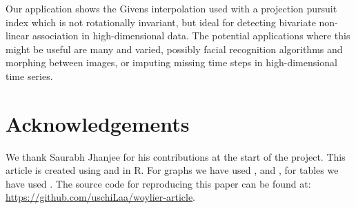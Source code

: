 Our application shows the Givens interpolation used with a projection pursuit index which is not rotationally invariant, but ideal for detecting bivariate non-linear association in high-dimensional data. The potential applications where this might be useful are many and varied, possibly facial recognition algorithms and morphing between images, or imputing missing time steps in high-dimensional time series.

\section*{Acknowledgements}\label{acknowledgements}

We thank Saurabh Jhanjee for his contributions at the start of the project. This article is created using  \citep{knitr} and  \citep{rmarkdown} in R. For graphs we have used  \citep{ggplot2},  \citep{cowplot} and  \citep{ggally}, for tables we have used  \citep{kableextra}. The source code for reproducing this paper can be found at: \url{https://github.com/uschiLaa/woylier-article}.



\address{%
Zoljargal Batsaikhan\\
Monash University\\%
Department of Econometrics and Business Statistics\\ Clayton, VIC, Australia\\
%
\url{https://github.com/zolabat}\\%
\textit{ORCiD: \href{https://orcid.org/0009-0005-0055-1448}{0009-0005-0055-1448}}\\%
\href{mailto:zoljargal11@gmail.com}{\nolinkurl{zoljargal11@gmail.com}}%
}

\address{%
Dianne Cook\\
Monash University\\%
Department of Econometrics and Business Statistics\\ Clayton, VIC, Australia\\
%
\url{http://www.dicook.org}\\%
\textit{ORCiD: \href{https://orcid.org/0000-0002-3813-7155}{0000-0002-3813-7155}}\\%
\href{mailto:dicook@monash.edu}{\nolinkurl{dicook@monash.edu}}%
}

\address{%
Ursula Laa\\
University of Natural Resources and Life Sciences Vienna\\%
Institute of Statistics\\ Vienna, Austria\\
%
\url{https://uschilaa.github.io}\\%
\textit{ORCiD: \href{https://orcid.org/0000-0002-0249-6439}{0000-0002-0249-6439}}\\%
\href{mailto:ursula.laa@boku.ac.at}{\nolinkurl{ursula.laa@boku.ac.at}}%
}
